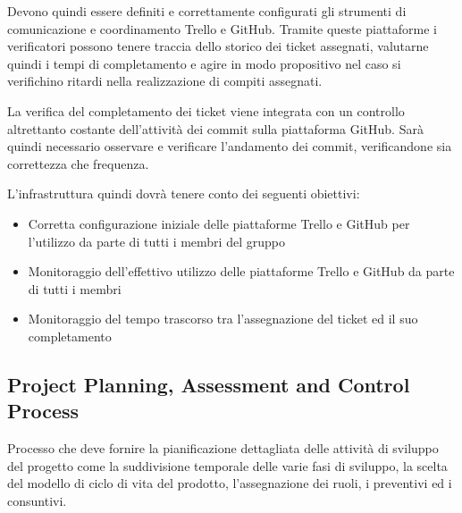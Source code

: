 \documentclass[a4paper,11pt]{article}
\begin{document}
Devono quindi essere definiti e correttamente configurati gli strumenti di comunicazione e coordinamento Trello e GitHub. Tramite queste piattaforme i verificatori possono tenere traccia dello storico dei ticket assegnati, valutarne quindi i tempi di completamento e agire in modo propositivo nel caso si verifichino ritardi nella realizzazione di compiti assegnati.

La verifica del completamento dei ticket viene integrata con un controllo altrettanto costante dell'attività dei commit sulla piattaforma GitHub. Sarà quindi necessario osservare e verificare l'andamento dei commit, verificandone sia correttezza che frequenza.

L'infrastruttura quindi dovrà tenere conto dei seguenti obiettivi:
\begin{itemize}
\item Corretta configurazione iniziale delle piattaforme Trello e GitHub per l'utilizzo da parte di tutti i membri del gruppo
\item Monitoraggio dell'effettivo utilizzo delle piattaforme Trello e GitHub da parte di tutti i membri
\item Monitoraggio del tempo trascorso tra l'assegnazione del ticket ed il suo completamento
\end{itemize} 


\subsection{Project Planning, Assessment and Control Process}
Processo che deve fornire la pianificazione dettagliata delle attività di sviluppo del progetto come la suddivisione temporale delle varie fasi di sviluppo, la scelta del modello di ciclo di vita del prodotto, l'assegnazione dei ruoli, i preventivi ed i consuntivi.
\end{document}
